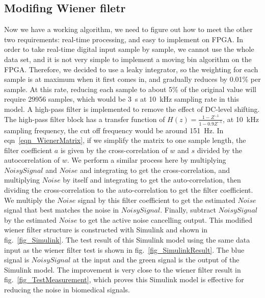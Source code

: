 \subsection{Modifing Wiener filetr}
Now we have a working algorithm, we need to figure out how to meet the other two requirements: real-time processing, and easy to implement on FPGA.  In order to take real-time digital input sample by sample, we cannot use the whole data set, and it is not very simple to implement a moving bin algorithm on the FPGA.  Therefore, we decided to use a leaky integrator, so the weighting for each sample is at maximum when it first comes in, and gradually reduces by 0.01\% per sample.  At this rate, reducing each sample to about 5\% of the original value will require 29956 samples, which would be \qty{3}{s} at \qty{10}{kHz} sampling rate in this model.  A high-pass filter is implemented to remove the effect of DC-level shifting.  The high-pass filter block has a transfer function of $H(z)=\frac{1-Z^{-1}}{1-0.9Z^{-1}}$, at \qty{10}{kHz} sampling frequency, the cut off frequency would be around \qty{151}{Hz}.  In eqn~\ref{eqn_WienerMatrix}, if we simplify the matrix to one sample length, the filter coefficient $a$ is given by the cross-correlation of $w$ and $s$ divided by the autocorrelation of $w$.  We perform a similar process here by multiplying $NoisySignal$ and $Noise$ and integrating to get the cross-correlation, and multiplying $Noise$ by itself and integrating to get the auto-correlation, then dividing the cross-correlation to the auto-correlation to get the filter coefficient.  We multiply the $Noise$ signal by this filter coefficient to get the estimated $Noise$ signal that best matches the noise in $NoisySignal$.  Finally, subtract $NoisySignal$ by the estimated $Noise$ to get the active noise cancelling output.  This modified wiener filter structure is constructed with Simulink and shown in fig.~\ref{fig_Simulink}.  The test result of this Simulink model using the same data input as the wiener filter test is shown in fig.~\ref{fig_SimulinkResult}.  The blue signal is $NoisySignal$ at the input and the green signal is the output of the Simulink model.  The improvement is very close to the wiener filter result in fig.~\ref{fig_TestMeasurement}, which proves this Simulink model is effective for reducing the noise in biomedical signals.

